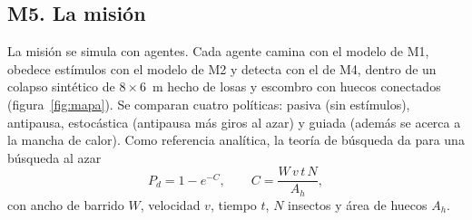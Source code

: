 \subsection{M5. La misión}

La misión se simula con agentes. Cada agente camina con el modelo de M1, obedece estímulos
con el modelo de M2 y detecta con el de M4, dentro de un colapso sintético de $8\times6$~m
hecho de losas y escombro con huecos conectados (figura~\ref{fig:mapa}). Se comparan cuatro
políticas: pasiva (sin estímulos), antipausa, estocástica (antipausa más giros al azar) y guiada
(además se acerca a la mancha de calor). Como referencia analítica, la teoría de búsqueda da
para una búsqueda al azar~\cite{frost2001}
\begin{equation}
P_d=1-e^{-C},\qquad C=\frac{W\,v\,t\,N}{A_h},
\end{equation}
con ancho de barrido $W$, velocidad $v$, tiempo $t$, $N$ insectos y área de huecos $A_h$.

